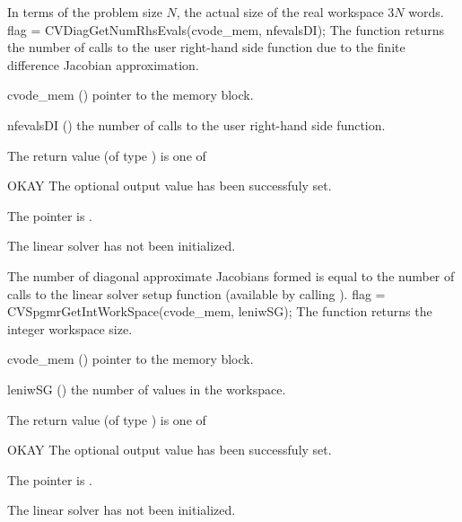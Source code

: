 {
  In terms of the problem size $N$, the actual size of the real workspace
  $3 N$  words.
}
{
  flag = CVDiagGetNumRhsEvals(cvode\_mem, nfevalsDI);
}
{
  The function  returns the
  number of calls to the user right-hand side function due to the 
  finite difference Jacobian approximation.
}
{
  \begin{args}
  \item[cvode\_mem] ()
    pointer to the {\cvodes} memory block.
  \item[nfevalsDI] ()
    the number of calls to the user right-hand side function.
  \end{args}
}
{
  The return value  (of type ) is one of
  \begin{args}
  \item[OKAY] 
    The optional output value has been successfuly set.
  \item[\Id{LIN\_NO\_MEM}]
    The  pointer is .
  \item[\Id{LIN\_NO\_LMEM}]
    The {\cvdiag} linear solver has not been initialized.
  \end{args}
}
{
  The number of diagonal approximate Jacobians formed is
  equal to the number of calls to the linear solver setup function
  (available by calling ).
}
%
%
{
  flag = CVSpgmrGetIntWorkSpace(cvode\_mem, leniwSG);
}
{
  The function  returns the
  {\cvspgmr} integer workspace size.
}
{
  \begin{args}
  \item[cvode\_mem] ()
    pointer to the {\cvodes} memory block.
  \item[leniwSG] ()
    the number of  values in the {\cvspgmr} workspace.
  \end{args}
}
{
  The return value  (of type ) is one of
  \begin{args}
  \item[OKAY] 
    The optional output value has been successfuly set.
  \item[\Id{LIN\_NO\_MEM}]
    The  pointer is .
  \item[\Id{LIN\_NO\_LMEM}]
    The {\cvspgmr} linear solver has not been initialized.
  \end{args}
}
